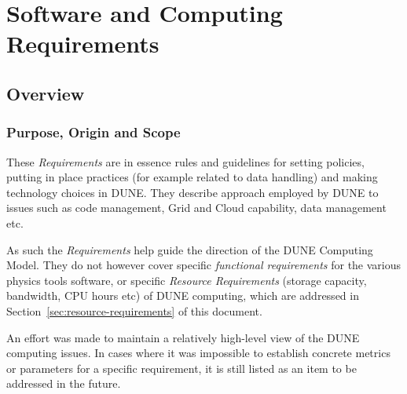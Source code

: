 \section{Software and Computing Requirements}
\label{sec:requirements}
\subsection{Overview}
\subsubsection{Purpose, Origin and Scope}

These \textit{Requirements} are in essence rules and guidelines for setting policies,
putting in place practices (for example related to data handling) and making technology choices in DUNE.
They describe approach employed by DUNE to issues such as  code management, Grid and Cloud capability, data management etc.

As such  the \textit{Requirements} help guide the direction of the DUNE Computing Model.
They do not however cover specific \textit{functional requirements}
for the various physics tools software, or specific \textit{Resource Requirements} (storage capacity, bandwidth, CPU hours etc) of DUNE computing,
which are addressed in Section~\ref{sec:resource-requirements} of this document.

An effort was made to maintain a relatively high-level view of the DUNE computing issues. In cases where it was impossible to establish concrete metrics or
parameters for a specific requirement, it is still listed as an item to be addressed in the future.




